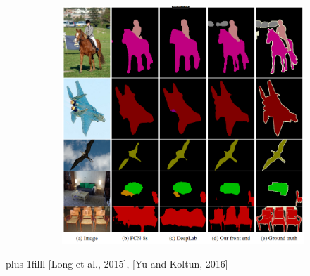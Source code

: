 \documentclass{beamer}
\newcommand{\source}[1]{\vskip0pt plus 1filll \scriptsize #1}
\begin{document}
\begin{frame}
\begin{figure}[h]
\begin{subfigure}{0.5\textwidth}
				\includegraphics[width=\textwidth]{plots/segmentationComparison.png}
			\end{subfigure}
		\end{figure}
		\source{[Long et al., 2015], [Yu and Koltun, 2016]}
	\end{frame}
\end{document}

